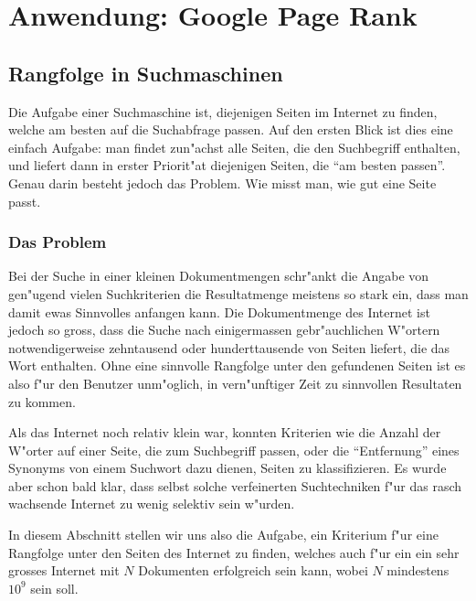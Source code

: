 %
%
%
\section{Anwendung: Google Page Rank} \label{pagerank}

\subsection{Rangfolge in Suchmaschinen}
Die Aufgabe einer Suchmaschine ist, diejenigen Seiten im Internet zu
finden, welche am besten auf die Suchabfrage passen. Auf den ersten
Blick ist dies eine einfach Aufgabe: man findet zun"achst alle Seiten,
die den Suchbegriff enthalten, und liefert dann in erster Priorit"at
diejenigen Seiten, die ``am besten passen''. Genau darin besteht jedoch
das Problem. Wie misst man, wie gut eine Seite passt.

\subsubsection{Das Problem}
Bei der Suche in einer kleinen Dokumentmengen schr"ankt die Angabe von
gen"ugend vielen Suchkriterien die Resultatmenge meistens so stark
ein, dass man damit ewas Sinnvolles anfangen kann. Die Dokumentmenge
des Internet ist jedoch so gross, dass die Suche nach einigermassen
gebr"auchlichen W"ortern notwendigerweise zehntausend oder hunderttausende
von Seiten liefert, die das Wort enthalten. Ohne eine sinnvolle Rangfolge
unter den gefundenen Seiten ist es also f"ur den Benutzer unm"oglich, in
vern"unftiger Zeit zu sinnvollen Resultaten zu kommen.

Als das Internet noch relativ klein war, konnten Kriterien wie die
Anzahl der W"orter auf einer Seite, die zum Suchbegriff passen,
oder die ``Entfernung'' eines Synonyms von einem Suchwort dazu dienen,
Seiten zu klassifizieren. Es wurde aber schon bald klar, dass selbst
solche verfeinerten Suchtechniken f"ur das rasch wachsende Internet
zu wenig selektiv sein w"urden.

In diesem Abschnitt stellen wir uns also die Aufgabe, ein Kriterium
f"ur eine Rangfolge unter den Seiten des Internet zu finden, welches auch
f"ur ein ein sehr grosses Internet mit $N$ Dokumenten erfolgreich sein kann,
wobei $N$ mindestens $10^9$ sein soll.

